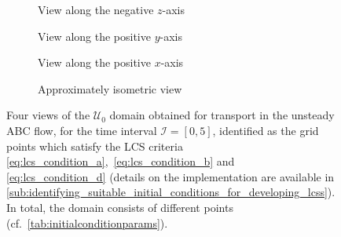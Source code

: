 \begin{figure}[htpb]
    \centering
    \begin{subfigure}[b]{0.475\textwidth}
        \centering
        \caption[]{{\small View along the negative $z$-axis}}
        \label{fig:unsteady_abd_z}
    \end{subfigure}
    \begin{subfigure}[b]{0.475\textwidth}
        \centering
        \caption[]{{\small View along the positive $y$-axis}}
        \label{fig:unsteady_abd_y}
    \end{subfigure}

    \begin{subfigure}[b]{0.475\textwidth}
        \centering
        \caption[]{{\small View along the positive $x$-axis}}
        \label{fig:unsteady_abd_x}
    \end{subfigure}
    \begin{subfigure}[b]{0.475\textwidth}
        \centering
        \caption[]{{\small Approximately isometric view}}
        \label{fig:unsteady_abd_isometric}
    \end{subfigure}
    \caption[Four views of the $\mathcal{U}_{0}$ domain obtained for transport
    in the unsteady ABC flow]
    {
        Four views of the $\mathcal{U}_{0}$ domain obtained for transport in the
        unsteady ABC flow, for the time interval $\mathcal{I}=[0,5]$,
        identified as the grid points which satisfy the LCS criteria
        \eqref{eq:lcs_condition_a},~\eqref{eq:lcs_condition_b} and~
        \eqref{eq:lcs_condition_d} (details on the implementation are available
        in
        \cref{sub:identifying_suitable_initial_conditions_for_developing_lcss}).
        In total, the domain consists of  different points
        (cf.\ \cref{tab:initialconditionparams}).
}
    \label{fig:unsteady_abd}
\end{figure}

